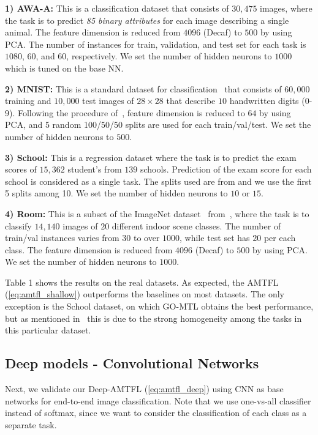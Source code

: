 \documentclass{article}
\begin{document}
	\noindent \textbf{1) AWA-A:} This is a classification dataset \cite{lampert-attributes} that consists of $30,475$ images, where the task is to predict \textit{85 binary attributes} for each image describing a single animal. The feature dimension is reduced from $4096$ (Decaf) to $500$ by using PCA. The number of instances for train, validation, and test set for each task is $1080$, $60$, and $60$, respectively. We set the number of hidden neurons to $1000$ which is tuned on the base NN.
	
	\noindent \textbf{2) MNIST:} This is a standard dataset for classification~\cite{mnist} that consists of $60,000$ training and $10,000$ test images of $28\times28$ that describe $10$ handwritten digits (0-9). Following the procedure of~\cite{go-mtl}, feature dimension is reduced to $64$ by using PCA, and 5 random 100/50/50 splits are used for each train/val/test. We set the number of hidden neurons to $500$.
	
	\noindent \textbf{3) School:} This is a regression dataset where the task is to predict the exam scores of $15,362$ student's from $139$ schools. Prediction of the exam score for each school is considered as a single task. The splits used are from \cite{argyriou08} and we use the first 5 splits among 10. We set the number of hidden neurons to $10$ or $15$.
	
	\noindent \textbf{4) Room:} This is a subset of the ImageNet dataset~\cite{imagenet} from~\cite{amtl}, where the task is to classify $14,140$ images of $20$ different indoor scene classes. The number of train/val instances varies from $30$ to over $1000$, while test set has $20$ per each class. The feature dimension is reduced from $4096$ (Decaf) to $500$ by using PCA. We set the number of hidden neurons to $1000$.
	
	Table 1 shows the results on the real datasets. As expected, the AMTFL (\ref{eq:amtfl_shallow}) outperforms the baselines on most datasets. The only exception is the School dataset, on which GO-MTL obtains the best performance, but as mentioned in~\cite{amtl} this is due to the strong homogeneity among the tasks in this particular dataset.
	
	\subsection{Deep models - Convolutional Networks}
	Next, we validate our Deep-AMTFL (\ref{eq:amtfl_deep}) using CNN as base networks for end-to-end image classification. Note that we use one-vs-all classifier instead of softmax, since we want to consider the classification of each class as a separate task. 
\end{document}
